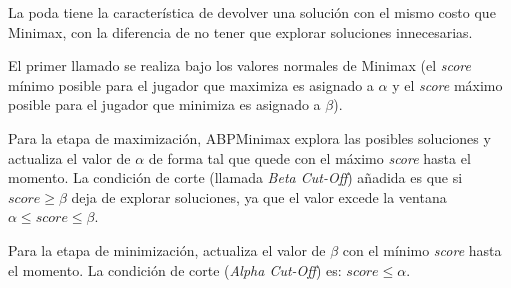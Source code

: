 \documentclass[10pt,a4paper,notitlepage]{article}
\begin{document}
La poda tiene la característica de devolver una solución con el mismo costo que Minimax, con la diferencia de no tener que explorar soluciones innecesarias.

El primer llamado se realiza bajo los valores normales de Minimax (el \textit{score} mínimo posible para el jugador que maximiza es asignado a $\alpha$ y el \textit{score} máximo posible para el jugador que minimiza es asignado a $\beta$).

Para la etapa de maximización, ABPMinimax explora las posibles soluciones y actualiza el valor de $\alpha$ de forma tal que quede con el máximo \textit{score} hasta el momento. La condición de corte (llamada \textit{Beta Cut-Off}) añadida es que si $score \geq \beta$ deja de explorar soluciones, ya que el valor excede la ventana $\alpha \leq score \leq \beta$.

Para la etapa de minimización, actualiza el valor de $\beta$ con el mínimo \textit{score} hasta el momento. La condición de corte (\textit{Alpha Cut-Off}) es: $score \leq \alpha$.
\end{document}
